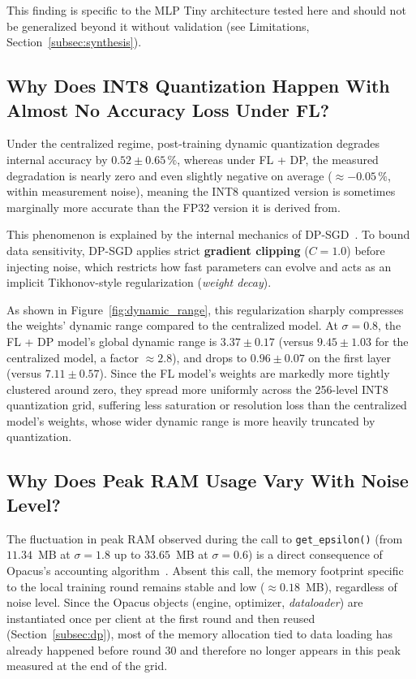 \documentclass{article}
\begin{document}
This finding is specific to the MLP Tiny architecture tested here and should not
be generalized beyond it without validation (see Limitations,
Section~\ref{subsec:synthesis}).

\subsection{Why Does INT8 Quantization Happen With Almost No Accuracy Loss Under
FL?}

Under the centralized regime, post-training dynamic quantization degrades
internal accuracy by $0.52 \pm 0.65\,\%$, whereas under FL + DP, the measured
degradation is nearly zero and even slightly negative on average
($\approx -0.05\,\%$, within measurement noise), meaning the INT8 quantized
version is sometimes marginally more accurate than the FP32 version it is
derived from.

This phenomenon is explained by the internal mechanics of
DP-SGD~\cite{abadi2016deep}. To bound data sensitivity, DP-SGD applies strict
\textbf{gradient clipping} ($C=1.0$) before injecting noise, which restricts how
fast parameters can evolve and acts as an implicit Tikhonov-style regularization
(\textit{weight decay}).

As shown in Figure~\ref{fig:dynamic_range}, this regularization sharply
compresses the weights' dynamic range compared to the centralized model. At
$\sigma = 0.8$, the FL + DP model's global dynamic range is $3.37 \pm 0.17$
(versus $9.45 \pm 1.03$ for the centralized model, a factor $\approx 2.8$), and
drops to $0.96 \pm 0.07$ on the first layer (versus $7.11 \pm 0.57$). Since the
FL model's weights are markedly more tightly clustered around zero, they spread
more uniformly across the 256-level INT8 quantization grid, suffering less
saturation or resolution loss than the centralized model's weights, whose wider
dynamic range is more heavily truncated by quantization.

\subsection{Why Does Peak RAM Usage Vary With Noise Level?}

The fluctuation in peak RAM observed during the call to \texttt{get\_epsilon()}
(from $11.34$~MB at $\sigma=1.8$ up to $33.65$~MB at $\sigma=0.6$) is a direct
consequence of Opacus's accounting algorithm~\cite{opacus}. Absent this call, the
memory footprint specific to the local training round remains stable and low
($\approx 0.18$~MB), regardless of noise level. Since the Opacus objects (engine,
optimizer, \textit{dataloader}) are instantiated once per client at the first
round and then reused (Section~\ref{subsec:dp}), most of the memory allocation
tied to data loading has already happened before round 30 and therefore no
longer appears in this peak measured at the end of the grid.
\end{document}
